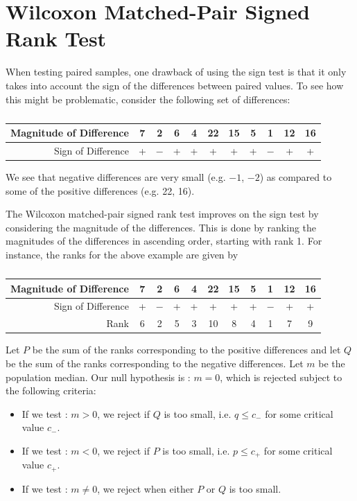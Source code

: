 \section{Wilcoxon Matched-Pair Signed Rank Test}

When testing paired samples, one drawback of using the sign test is that it only takes into account the sign of the differences between paired values. To see how this might be problematic, consider the following set of differences:

\begin{table}[H]
    \centering
    \begin{tabular}{|r|c|c|c|c|c|c|c|c|c|c|}
        \hline
        Magnitude of Difference & 7 & 2 & 6 & 4 & 22 & 15 & 5 & 1 & 12 & 16 \\ \hline
        Sign of Difference & + & $-$ & + & + & + & + & + & $-$ & + & + \\ \hline
    \end{tabular}
    \caption{}
\end{table}

We see that negative differences are very small (e.g. $-1$, $-2$) as compared to some of the positive differences (e.g. 22, 16).

The Wilcoxon matched-pair signed rank test improves on the sign test by considering the magnitude of the differences. This is done by ranking the magnitudes of the differences in ascending order, starting with rank 1. For instance, the ranks for the above example are given by

\begin{table}[H]
    \centering
    \begin{tabular}{|r|c|c|c|c|c|c|c|c|c|c|}
        \hline
        Magnitude of Difference & 7 & 2 & 6 & 4 & 22 & 15 & 5 & 1 & 12 & 16 \\ \hline
        Sign of Difference & + & $-$ & + & + & + & + & + & $-$ & + & + \\ \hline
        Rank & 6 & 2 & 5 & 3 & 10 & 8 & 4 & 1 & 7 & 9 \\ \hline
    \end{tabular}
    \caption{}
\end{table}

Let $P$ be the sum of the ranks corresponding to the positive differences and let $Q$ be the sum of the ranks corresponding to the negative differences. Let $m$ be the population median. Our null hypothesis is \nullhyp: $m = 0$, which is rejected subject to the following criteria:
\begin{itemize}
    \item If we test \althyp: $m > 0$, we reject \nullhyp{} if $Q$ is too small, i.e. $q \leq c_-$ for some critical value $c_-$.
    \item If we test \althyp: $m < 0$, we reject \nullhyp{} if $P$ is too small, i.e. $p \leq c_+$ for some critical value $c_+$.
    \item If we test \althyp: $m \neq 0$, we reject \nullhyp{} when either $P$ or $Q$ is too small.
\end{itemize}

